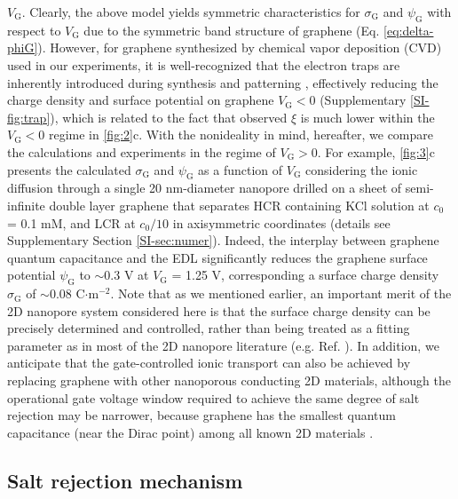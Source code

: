 $V_{\mathrm{G}}$. Clearly, the above model yields symmetric
characteristics for $\sigma_{\mathrm{G}}$ and $\psi_{\mathrm{G}}$ with
respect to $V_{\mathrm{G}}$ due to the symmetric band structure of
graphene (Eq. \eqref{eq:delta-phiG}). However, for graphene
synthesized by chemical vapor deposition (CVD) used in our
experiments, it is well-recognized that the electron traps are
inherently introduced during synthesis and patterning
\cite{Dean_2010}, effectively reducing the charge density and surface
potential on graphene $V_{\mathrm{G}}<0$ (Supplementary \Fig{}
\ref{SI-fig:trap}), which is related to the fact that observed $\xi$
is much lower within the $V_{\mathrm{G}}<0$ regime in \Fig{}
\ref{fig:2}c. With the nonideality in mind, hereafter, we compare the
calculations and experiments in the regime of $V_{\mathrm{G}}>0$. For
example, \Fig{} \ref{fig:3}c presents the calculated
$\sigma_{\mathrm{G}}$ and $\psi_{\mathrm{G}}$ as a function of
$V_{\mathrm{G}}$ considering the ionic diffusion through a single 20
nm-diameter nanopore drilled on a sheet of semi-infinite double layer
graphene that separates HCR containing KCl solution at $c_{0}$ = 0.1
mM, and LCR at $c_{0}/10$ in axisymmetric coordinates (details see
Supplementary Section \ref{SI-sec:numer}). Indeed, the interplay
between graphene quantum capacitance and the EDL significantly reduces
the graphene surface potential $\psi_{\mathrm{G}}$ to $\sim$0.3 V at
$V_{\mathrm{G}}$ = 1.25 V, corresponding a surface charge density
$\sigma_{\mathrm{G}}$ of $\sim$0.08 C$\cdot$m$^{-2}$. Note that as we
mentioned earlier, an important merit of the 2D nanopore system
considered here is that the surface charge density can be precisely
determined and controlled, rather than being treated as a fitting
parameter as in most of the 2D nanopore literature
(e.g. Ref. \cite{Rollings_2016}). In addition, we anticipate that
the gate-controlled ionic transport can also be achieved by replacing
graphene with other nanoporous conducting 2D materials, although the
operational gate voltage window required to achieve the same degree of
salt rejection may be narrower, because graphene has the smallest
quantum capacitance (near the Dirac point) among all known 2D
materials \cite{Tian_2016}.

\subsection{Salt rejection mechanism}
\label{sec:mechanism}

